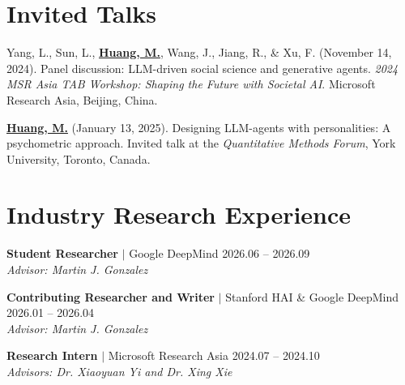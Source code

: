 \documentclass[11pt,letterpaper]{article}
\newcommand{\myname}[1]{\textbf{\uline{#1}}}
\newcommand{\advisor}[1]{\hspace*{1em}\textit{Advisor: #1}}
\newcommand{\advisors}[1]{\hspace*{1em}\textit{Advisors: #1}}
\begin{document}
\section*{Invited Talks}

\begin{enumerate}[label={[\arabic*]}]
    \item Yang, L., Sun, L., \myname{Huang, M.}, Wang, J., Jiang, R., \& Xu, F. (November 14, 2024). Panel discussion: LLM-driven social science and generative agents. \textit{2024 MSR Asia TAB Workshop: Shaping the Future with Societal AI}. Microsoft Research Asia, Beijing, China.

    \item \myname{Huang, M.} (January 13, 2025). Designing LLM-agents with personalities: A psychometric approach. Invited talk at the \textit{Quantitative Methods Forum}, York University, Toronto, Canada.
\end{enumerate}

\section*{Industry Research Experience}

\noindent\begin{minipage}{\textwidth}
\noindent\textbf{Student Researcher} $|$ Google DeepMind \hfill 2026.06 -- 2026.09\\
\noindent\advisor{Martin J. Gonzalez}
\end{minipage}

\vspace{0.5em}
\noindent\begin{minipage}{\textwidth}
\noindent\textbf{Contributing Researcher and Writer} $|$ Stanford HAI \& Google DeepMind \hfill 2026.01 -- 2026.04\\
\noindent\advisor{Martin J. Gonzalez}
\end{minipage}

\vspace{0.5em}
\noindent\begin{minipage}{\textwidth}
\noindent\textbf{Research Intern} $|$ Microsoft Research Asia \hfill 2024.07 -- 2024.10\\
\noindent\advisors{Dr. Xiaoyuan Yi and Dr. Xing Xie}
\end{minipage}
\end{document}
